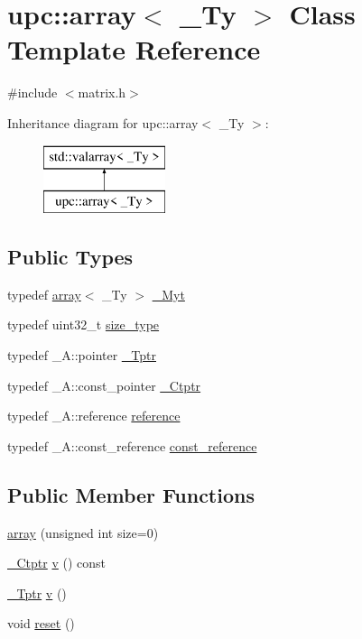 \hypertarget{classupc_1_1array}{}\section{upc\+:\+:array$<$ \+\_\+\+Ty $>$ Class Template Reference}
\label{classupc_1_1array}


{\ttfamily \#include $<$matrix.\+h$>$}

Inheritance diagram for upc\+:\+:array$<$ \+\_\+\+Ty $>$\+:\begin{figure}[H]
\begin{center}
\leavevmode
\includegraphics[height=2.000000cm]{classupc_1_1array}
\end{center}
\end{figure}
\subsection*{Public Types}
\begin{DoxyCompactItemize}
\item 
typedef \hyperlink{classupc_1_1array}{array}$<$ \+\_\+\+Ty $>$ \hyperlink{classupc_1_1array_a9c800a9bf971fc1d7c02a34803f87115}{\+\_\+\+Myt}
\item 
typedef uint32\+\_\+t \hyperlink{classupc_1_1array_a85501f086a20ed6686ef78a242b2f302}{size\+\_\+type}
\item 
typedef \+\_\+\+A\+::pointer \hyperlink{classupc_1_1array_a4ef66945898a2c393cff5be41de077d2}{\+\_\+\+Tptr}
\item 
typedef \+\_\+\+A\+::const\+\_\+pointer \hyperlink{classupc_1_1array_a420718228a4d845721303a19755f0d42}{\+\_\+\+Ctptr}
\item 
typedef \+\_\+\+A\+::reference \hyperlink{classupc_1_1array_a99066373537d57ee780ce4d3396314f8}{reference}
\item 
typedef \+\_\+\+A\+::const\+\_\+reference \hyperlink{classupc_1_1array_a3b639eaadbf9a2c410d7c02d3d1c01e4}{const\+\_\+reference}
\end{DoxyCompactItemize}
\subsection*{Public Member Functions}
\begin{DoxyCompactItemize}
\item 
\hyperlink{classupc_1_1array_a91a96a5d4ba2076aa8d221916d8376a2}{array} (unsigned int size=0)
\item 
\hyperlink{classupc_1_1array_a420718228a4d845721303a19755f0d42}{\+\_\+\+Ctptr} \hyperlink{classupc_1_1array_a160dca0372cf7ec405a44e6c43852381}{v} () const 
\item 
\hyperlink{classupc_1_1array_a4ef66945898a2c393cff5be41de077d2}{\+\_\+\+Tptr} \hyperlink{classupc_1_1array_a1b5e50b24d426dd6652139190c0d5b62}{v} ()
\item 
void \hyperlink{classupc_1_1array_aeb72a62336fc9474afdf3fa6f5cea9ca}{reset} ()
\end{DoxyCompactItemize}
